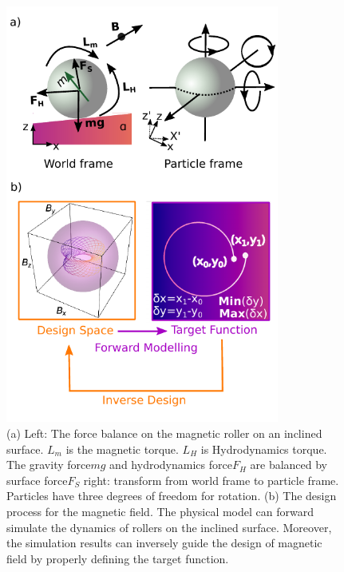 \begin{figure}[p]
\centering
\includegraphics[width=9cm]{figures/5_2.pdf}
\caption{ (a) Left: The force balance on the magnetic roller on an inclined surface. $L_m$ is the magnetic torque. $L_H$ is Hydrodynamics torque. The gravity force$mg$ and hydrodynamics force$F_H$ are balanced by surface force$F_S$   right: transform from world frame to particle frame. Particles have three degrees of freedom for rotation. (b) The design process for the magnetic field. The physical model can forward simulate the dynamics of rollers on the inclined surface. Moreover, the simulation results can inversely guide the design of magnetic field by properly defining the target function.}
\label{fig:5.2}
\end{figure}
